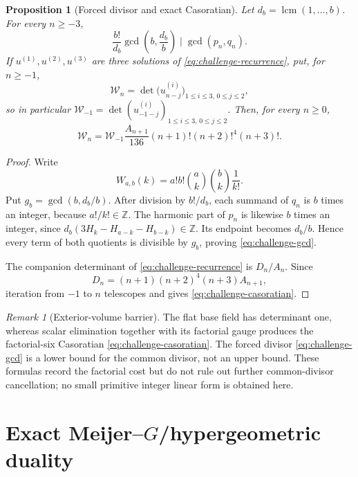 \documentclass[11pt]{article}
\theoremstyle{keio}
\newtheorem{proposition}[theorem]{Proposition}
\theoremstyle{definition}
\theoremstyle{remark}
\newtheorem{remark}[theorem]{Remark}
\newcommand{\Z}{\mathbb Z}
\newcommand{\lcm}{\operatorname{lcm}}
\begin{document}
\begin{proposition}[Forced divisor and exact Casoratian]
\label{prop:challenge-arithmetic}
Let \(d_b=\lcm(1,\ldots,b)\).  For every \(n\ge-3\),
\begin{equation}\label{eq:challenge-gcd}
 \boxed{\displaystyle
 \frac{b!}{d_b}\gcd\!\left(b,\frac{d_b}{b}\right)
 \mid\gcd(p_n,q_n).}
\end{equation}
If \(u^{(1)},u^{(2)},u^{(3)}\) are three solutions of
\eqref{eq:challenge-recurrence}, put, for \(n\ge-1\),
\[
 \mathcal W_n=\det\bigl(u^{(i)}_{n-j}\bigr)_{1\le i\le3,\,0\le j\le2},
\]
so in particular
\(\mathcal W_{-1}=\det(u^{(i)}_{-1-j})_{1\le i\le3,\,0\le j\le2}\).
Then, for every \(n\ge0\),
\begin{equation}\label{eq:challenge-casoratian}
 \boxed{\displaystyle
 \mathcal W_n=\mathcal W_{-1}
 \frac{A_{n+1}}{136}
 (n+1)!(n+2)!^4(n+3)!.}
\end{equation}
\end{proposition}

\begin{proof}
Write
\[
 W_{a,b}(k)=a!b!\binom ak\binom bk\frac1{k!}.
\]
Put \(g_b=\gcd(b,d_b/b)\).  After division by \(b!/d_b\), each summand of
\(q_n\) is \(b\) times an integer, because \(a!/k!\in\Z\).  The harmonic
part of \(p_n\) is likewise \(b\) times an integer, since
\(d_b(3H_k-H_{a-k}-H_{b-k})\in\Z\).  Its endpoint becomes \(d_b/b\).
Hence every term of both quotients is divisible by \(g_b\), proving
\eqref{eq:challenge-gcd}.

The companion determinant of \eqref{eq:challenge-recurrence} is
\(D_n/A_n\).  Since
\[
 D_n=(n+1)(n+2)^4(n+3)A_{n+1},
\]
iteration from \(-1\) to \(n\) telescopes and gives
\eqref{eq:challenge-casoratian}.
\end{proof}

\begin{remark}[Exterior-volume barrier]
The flat base field has determinant one, whereas scalar elimination together
with its factorial gauge produces the factorial-six Casoratian
\eqref{eq:challenge-casoratian}.  The forced divisor
\eqref{eq:challenge-gcd} is a lower bound for the common divisor, not an
upper bound.  These formulas record the factorial cost but do not rule out
further common-divisor cancellation; no small primitive integer linear form
is obtained here.
\end{remark}

\section{Exact Meijer--\texorpdfstring{\(G\)}{G}/hypergeometric duality}
\label{sec:meijer-duality}
\end{document}
